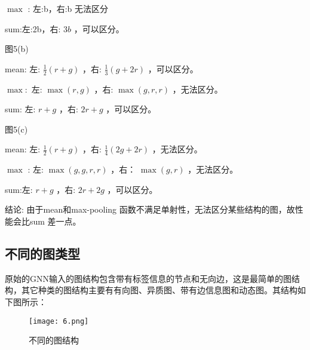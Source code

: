 \documentclass[a4paper,UTF8]{article}
\numberwithin{equation}{section}
\begin{document}
{		$\max$ : 左:b，右:b 无法区分
		
		sum:左:2b，右: $3 b$ ，可以区分。
		
		图5(b)
		
		mean: 左: $\frac{1}{2}(r+g)$ ，右: $\frac{1}{3}(g+2 r)$ ，可以区分。
		
		$\max :$ 左: $\max (r, g)$ ，右: $\max (g, r, r)$ ，无法区分。
		
		sum: 左: $r+g$ ，右: $2 r+g$ ，可以区分。
		
		图5(c)
		
		mean: 左: $\frac{1}{2}(r+g)$ ，右: $\frac{1}{4}(2 g+2 r)$ ，无法区分。
		
		$\max$ : 左: $\max (g, g, r, r)$ ，右： $\max (g, r)$ ，无法区分。
		
		sum:左: $r+g$ ，右: $2 r+2 g$ ，可以区分。
		
		结论: 由于mean和max-pooling 函数不满足单射性，无法区分某些结构的图，故性能会比sum 差一点。
		
		\subsection{不同的图类型}
		原始的GNN输入的图结构包含带有标签信息的节点和无向边，这是最简单的图结构，其它种类的图结构主要有有向图、异质图、带有边信息图和动态图。其结构如下图所示：
		\begin{figure}[ht]
			\centering
			\texttt{[image: 6.png]}
			\caption{不同的图结构}
			\label{fig:label}
		\end{figure}
		
}
\end{document}
